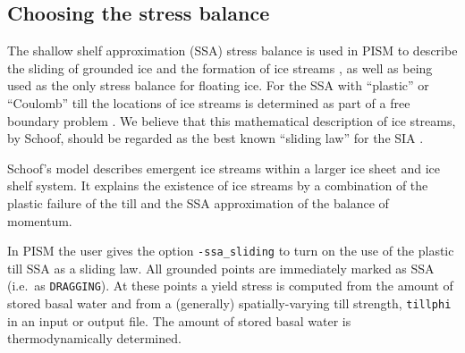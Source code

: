 \begin{comment}
\opt{shelfext\und} When computing ice shelf and stream velocity, PISM enforces boundary conditions using a fictitious extension of the ice shelf over the entire domain.  This extension provides strength only, it does not change the mass, driving force, or location of the calving front.  By default, it's strength will be computed using the current ice type at reference thickness, temperature, and strain rate, customizable using \texttt{-shelfext_H} (5 meters by default), \texttt{-shelfext_T} (263.15 K), \texttt{-shelfext_Du} (1 m/a per km).  The extension strength is used whenever ice thickness is less than the extension thickness to prevent the equations from becoming singular.  You can also specify the extension strength directly using \texttt{-shelfext_force_nuH} with units in Pa s.  Finally, you can compute strength using a \texttt{custom} ice type the ice used in the rest of PISM by giving \texttt{-shelfext_use_private_ice}.  This option will gives you a \texttt{custom} ice type which you can control via \texttt{-shelfext_ice_custom_} (see \texttt{-ice_type}).  All \texttt{-shelfext} options are displayed in \texttt{-help}.
\end{comment}


\subsection{Choosing the stress balance}  \label{subsect:ssacontrol}

The shallow shelf approximation (SSA) stress balance is used in PISM to describe the sliding of grounded ice and the formation of ice streams \cite{BBssasliding}, as well as being used as the only stress balance for floating ice.  For the SSA with ``plastic'' or ``Coulomb'' till the locations of ice streams is determined as part of a free boundary problem \cite{SchoofStream}.  We believe that this mathematical description of ice streams, by Schoof, should be regarded as the best known ``sliding law'' for the SIA \cite{BBssasliding}.

Schoof's model \cite{SchoofStream} describes emergent ice streams within a larger ice sheet and ice shelf system.  It explains the existence of ice streams by a combination of the plastic failure of the till and the SSA approximation of the balance of momentum.  

In PISM the user gives the option \texttt{-ssa_sliding} to turn on the use of the plastic till SSA as a sliding law.  All grounded points are immediately marked as SSA (i.e.~as \texttt{DRAGGING}).  At these points a yield stress is computed from the amount of stored basal water and from a (generally) spatially-varying till strength, \texttt{tillphi} in an input or output file.  The amount of stored basal water is thermodynamically determined.

